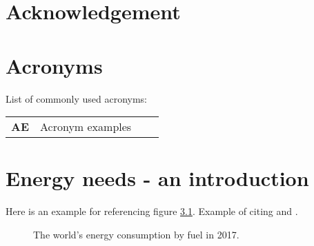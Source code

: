 \documentclass[openany,g5paper,electronic]{kthesis}
\begin{document}
\chapter{Acknowledgement}
\noindent \lipsum[1]

\chapter{Acronyms}
List of commonly used acronyms: \\

\begin{tabular}{llll}
\textbf{AE}		&	Acronym examples \\

\end{tabular}


\mainmatter %
\tableofcontents

\chapter{Energy needs - an introduction}
\label{Intro}
Here is an example for referencing figure \ref{EnergySources}. Example of citing \cite{BP2019} and \cite{Chen2016}.
\begin{figure}[h]
	\centering
	\caption{The world's energy consumption by fuel in 2017. }
	\label{EnergySources}
\end{figure}

\end{document}
